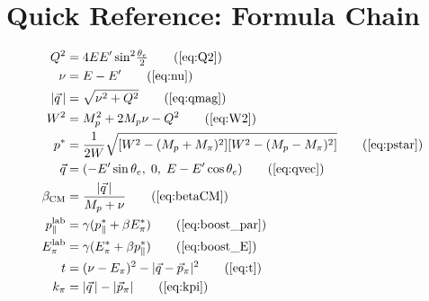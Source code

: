 \documentclass[12pt,a4paper]{article}
\begin{document}
\section{Quick Reference: Formula Chain}

\begin{align}
  Q^2     &= 4EE'\sin^2\!\tfrac{\theta_e}{2}
            \tag{\ref{eq:Q2}}\\
  \nu     &= E - E'
            \tag{\ref{eq:nu}}\\
  |\vec{q}\,| &= \sqrt{\nu^2 + Q^2}
            \tag{\ref{eq:qmag}}\\
  W^2     &= M_p^2 + 2M_p\nu - Q^2
            \tag{\ref{eq:W2}}\\
  p^*     &= \frac{1}{2W}\sqrt{[W^2-(M_p+M_\pi)^2][W^2-(M_p-M_\pi)^2]}
            \tag{\ref{eq:pstar}}\\
  \vec{q} &= (-E'\sin\theta_e,\;0,\;E - E'\cos\theta_e)
            \tag{\ref{eq:qvec}}\\
  \beta_\text{CM} &= \frac{|\vec{q}\,|}{M_p + \nu}
            \tag{\ref{eq:betaCM}}\\
  p_\parallel^\text{lab} &= \gamma(p_\parallel^* + \beta E_\pi^*)
            \tag{\ref{eq:boost_par}}\\
  E_\pi^\text{lab} &= \gamma(E_\pi^* + \beta p_\parallel^*)
            \tag{\ref{eq:boost_E}}\\
  t       &= (\nu - E_\pi)^2 - |\vec{q} - \vec{p}_\pi|^2
            \tag{\ref{eq:t}}\\
  k_\pi   &= |\vec{q}\,| - |\vec{p}_\pi|
            \tag{\ref{eq:kpi}}
\end{align}
\end{document}
